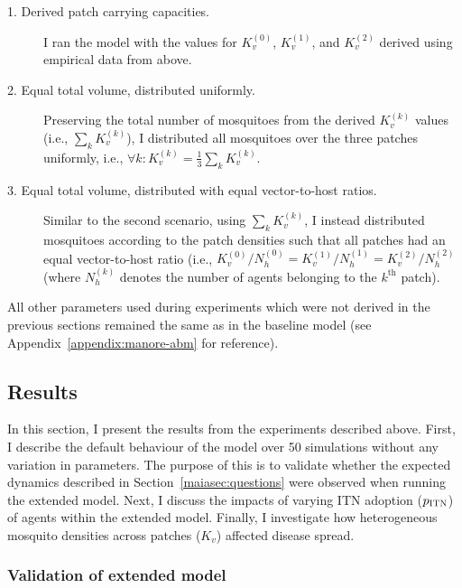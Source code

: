 \begin{description}
    \item[1. Derived patch carrying capacities.] I ran the model with the values for $K_v^{(0)}$, $K_v^{(1)}$, and $K_v^{(2)}$ derived using empirical data from \citet{vantaux_anopheles_2021} above.
    \item[2. Equal total volume, distributed uniformly.] Preserving the total number of mosquitoes from the derived $K_v^{(k)}$ values (i.e., $\sum_{k}{K_v^{(k)}}$), I distributed all mosquitoes over the three patches uniformly, i.e., $\forall k : K_v^{(k)}=\frac{1}{3}\sum_{k}{K_v^{(k)}}$.
    \item[3. Equal total volume, distributed with equal vector-to-host ratios.] Similar to the second scenario, using $\sum_{k}{K_v^{(k)}}$, I instead distributed mosquitoes according to the patch densities such that all patches had an equal vector-to-host ratio (i.e., $K_v^{(0)}/N^{(0)}_h=K_v^{(1)}/N^{(1)}_h=K_v^{(2)}/N^{(2)}_h$ (where $N^{(k)}_h$ denotes the number of agents belonging to the $k^{\text{th}}$ patch).
\end{description}

All other parameters used during experiments which were not derived in the previous sections remained the same as in the baseline model (see Appendix~\ref{appendix:manore-abm} for reference).

\subsection{Results}\label{sec:extended-model-results}

In this section, I present the results from the experiments described above. First, I describe the default behaviour of the model over 50 simulations without any variation in parameters. The purpose of this is to validate whether the expected dynamics described in Section~\ref{maiasec:questions} were observed when running the extended model. Next, I discuss the impacts of varying ITN adoption ($p_{\textsc{ITN}}$) of agents within the extended model. Finally, I investigate how heterogeneous mosquito densities across patches ($K_v$) affected disease spread.

\subsubsection{Validation of extended model}\label{sec:extended-model-validation}

